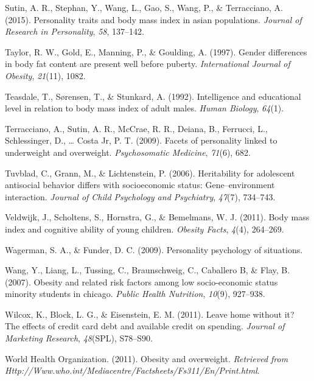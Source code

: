 \documentclass[man]{apa6}
\begin{document}
\leavevmode\hypertarget{ref-sutin2015personality}{}%
Sutin, A. R., Stephan, Y., Wang, L., Gao, S., Wang, P., \& Terracciano, A. (2015). Personality traits and body mass index in asian populations. \emph{Journal of Research in Personality}, \emph{58}, 137--142.

\leavevmode\hypertarget{ref-taylor1997gender}{}%
Taylor, R. W., Gold, E., Manning, P., \& Goulding, A. (1997). Gender differences in body fat content are present well before puberty. \emph{International Journal of Obesity}, \emph{21}(11), 1082.

\leavevmode\hypertarget{ref-teasdale1992intelligence}{}%
Teasdale, T., Sørensen, T., \& Stunkard, A. (1992). Intelligence and educational level in relation to body mass index of adult males. \emph{Human Biology}, \emph{64}(1).

\leavevmode\hypertarget{ref-terracciano2009facets}{}%
Terracciano, A., Sutin, A. R., McCrae, R. R., Deiana, B., Ferrucci, L., Schlessinger, D., \ldots{} Costa Jr, P. T. (2009). Facets of personality linked to underweight and overweight. \emph{Psychosomatic Medicine}, \emph{71}(6), 682.

\leavevmode\hypertarget{ref-tuvblad2006heritability}{}%
Tuvblad, C., Grann, M., \& Lichtenstein, P. (2006). Heritability for adolescent antisocial behavior differs with socioeconomic status: Gene--environment interaction. \emph{Journal of Child Psychology and Psychiatry}, \emph{47}(7), 734--743.

\leavevmode\hypertarget{ref-veldwijk2011body}{}%
Veldwijk, J., Scholtens, S., Hornstra, G., \& Bemelmans, W. J. (2011). Body mass index and cognitive ability of young children. \emph{Obesity Facts}, \emph{4}(4), 264--269.

\leavevmode\hypertarget{ref-wagerman2009personality}{}%
Wagerman, S. A., \& Funder, D. C. (2009). Personality psychology of situations.

\leavevmode\hypertarget{ref-wang2007}{}%
Wang, Y., Liang, L., Tussing, C., Braunschweig, C., Caballero B, \& Flay, B. (2007). Obesity and related risk factors among low socio-economic status minority students in chicago. \emph{Public Health Nutrition}, \emph{10}(9), 927--938.

\leavevmode\hypertarget{ref-wilcox2011leave}{}%
Wilcox, K., Block, L. G., \& Eisenstein, E. M. (2011). Leave home without it? The effects of credit card debt and available credit on spending. \emph{Journal of Marketing Research}, \emph{48}(SPL), S78--S90.

\leavevmode\hypertarget{ref-who2011}{}%
World Health Organization. (2011). Obesity and overweight. \emph{Retrieved from Http://Www.who.int/Mediacentre/Factsheets/Fs311/En/Print.html}.

\endgroup
\end{document}
